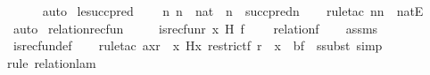 \begin{isabellebody}
\ \ \ \ \isamarkupfalse%
\ auto\isanewline
{}\isamarkupfalse%
%
\endisatagproof
{\isafoldproof}%
%
\isadelimproof
\isanewline
%
\endisadelimproof
\isanewline
{}\isamarkupfalse%
\ le{\isacharunderscore}{\kern0pt}succ{\isacharunderscore}{\kern0pt}pred\ {\isacharcolon}{\kern0pt}\ \isanewline
\ \ {\isachardoublequoteopen}{\isasymAnd}n{\isachardot}{\kern0pt}\ n\ {\isasymin}\ nat\ {\isasymLongrightarrow}\ n\ {\isasymle}\ succ{\isacharparenleft}{\kern0pt}pred{\isacharparenleft}{\kern0pt}n{\isacharparenright}{\kern0pt}{\isacharparenright}{\kern0pt}{\isachardoublequoteclose}\ \isanewline
%
\isadelimproof
\ \ %
\endisadelimproof
%
\isatagproof
{}\isamarkupfalse%
{\isacharparenleft}{\kern0pt}rule{\isacharunderscore}{\kern0pt}tac\ n{\isacharequal}{\kern0pt}n\ \ natE{\isacharparenright}{\kern0pt}\isanewline
\ \ \isamarkupfalse%
\ auto%
\endisatagproof
{\isafoldproof}%
%
\isadelimproof
\isanewline
%
\endisadelimproof
\isanewline
{}\isamarkupfalse%
\ relation{\isacharunderscore}{\kern0pt}recfun\ {\isacharcolon}{\kern0pt}\ \isanewline
\ \ \ {\isachardoublequoteopen}is{\isacharunderscore}{\kern0pt}recfun{\isacharparenleft}{\kern0pt}r{\isacharcomma}{\kern0pt}\ x{\isacharcomma}{\kern0pt}\ H{\isacharcomma}{\kern0pt}\ f{\isacharparenright}{\kern0pt}{\isachardoublequoteclose}\ \isanewline
\ \ \ {\isachardoublequoteopen}relation{\isacharparenleft}{\kern0pt}f{\isacharparenright}{\kern0pt}{\isachardoublequoteclose}\isanewline
%
\isadelimproof
\isanewline
\ \ %
\endisadelimproof
%
\isatagproof
{}\isamarkupfalse%
\ assms\ \isanewline
\ \ \isamarkupfalse%
\ is{\isacharunderscore}{\kern0pt}recfun{\isacharunderscore}{\kern0pt}def\ \isanewline
\ \ \isamarkupfalse%
{\isacharparenleft}{\kern0pt}rule{\isacharunderscore}{\kern0pt}tac\ a{\isacharequal}{\kern0pt}{\isachardoublequoteopen}{\isacharparenleft}{\kern0pt}{\isasymlambda}x{\isasymin}r\ {\isacharminus}{\kern0pt}{\isacharbackquote}{\kern0pt}{\isacharbackquote}{\kern0pt}\ {\isacharbraceleft}{\kern0pt}x{\isacharbraceright}{\kern0pt}{\isachardot}{\kern0pt}\ H{\isacharparenleft}{\kern0pt}x{\isacharcomma}{\kern0pt}\ restrict{\isacharparenleft}{\kern0pt}f{\isacharcomma}{\kern0pt}\ r\ {\isacharminus}{\kern0pt}{\isacharbackquote}{\kern0pt}{\isacharbackquote}{\kern0pt}\ {\isacharbraceleft}{\kern0pt}x{\isacharbraceright}{\kern0pt}{\isacharparenright}{\kern0pt}{\isacharparenright}{\kern0pt}{\isacharparenright}{\kern0pt}{\isachardoublequoteclose}\ \ b{\isacharequal}{\kern0pt}f\ \ ssubst{\isacharcomma}{\kern0pt}\ simp{\isacharparenright}{\kern0pt}\isanewline
\ \ \isamarkupfalse%
{\isacharparenleft}{\kern0pt}rule\ relation{\isacharunderscore}{\kern0pt}lam{\isacharparenright}{\kern0pt}\isanewline
\ \ \isamarkupfalse%
%
\endisatagproof
{\isafoldproof}%
%
\isadelimproof
\isanewline
%
\endisadelimproof
\isanewline
%
\isadelimtheory
\isanewline
%
\endisadelimtheory
%
\isatagtheory
{}\isamarkupfalse%
%
\endisatagtheory
{\isafoldtheory}%
%
\isadelimtheory
%
\endisadelimtheory
%
\end{isabellebody}%
